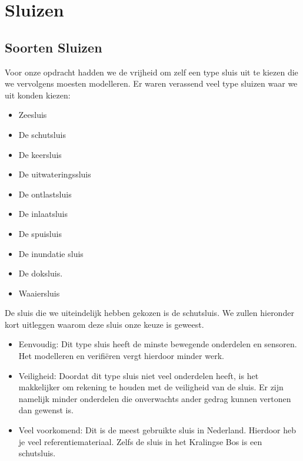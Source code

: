 \documentclass[oneside]{scrbook}
\begin{document}
\listoftables

\tableofcontents{}


\chapter{Sluizen}
\section{Soorten Sluizen}
Voor onze opdracht hadden we de vrijheid om zelf een type sluis uit te kiezen die we vervolgens moesten modelleren. Er waren verassend veel type sluizen waar we uit konden kiezen:

\begin{itemize}
    \item Zeesluis
    \item De schutsluis
    \item De keersluis
    \item De uitwateringssluis
    \item De ontlastsluis
    \item De inlaatsluis
    \item De spuisluis
    \item De inundatie sluis
    \item De doksluis.
    \item Waaiersluis

\end{itemize}
De sluis die we uiteindelijk hebben gekozen is de schutsluis. We zullen hieronder kort uitleggen waarom deze sluis onze keuze is geweest.

\begin{itemize}
    \item Eenvoudig: Dit type sluis heeft de minste bewegende onderdelen en sensoren. Het modelleren en verifiëren vergt hierdoor minder werk.
    \item Veiligheid: Doordat dit type sluis niet veel onderdelen heeft, is het makkelijker om rekening te houden met de veiligheid van de sluis. Er zijn namelijk minder onderdelen die onverwachts ander gedrag kunnen vertonen dan gewenst is.
    \item Veel voorkomend: Dit is de meest gebruikte sluis in Nederland. Hierdoor heb je veel referentiemateriaal. Zelfs de sluis in het Kralingse Bos is een schutsluis.
\end{itemize}
\end{document}

